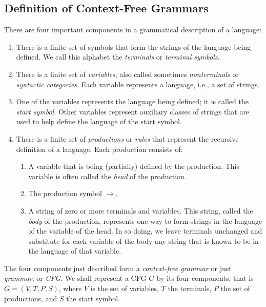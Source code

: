 \documentclass[]{article}
\begin{document}
  \subsection*{Definition of Context-Free Grammars}
    There are four important components in a grammatical description of a
    language:
      \begin{enumerate}
        \item There is a finite set of symbols that form the strings of the
        language being defined. We call this alphabet the \emph{terminals} or
        \emph{terminal symbols}.
        \item There is a finite set of \emph{variables}, also called sometimes
        \emph{nonterminals} or \emph{syntactic categories}. Each variable
        represents a language, i.e., a set of strings.
        \item One of the variables represents the language being defined; it is
        called the \emph{start symbol}. Other variables represent auxiliary
        classes of strings that are used to help define the language of the
        start symbol.
        \item There is a finite set of \emph{productions} or \emph{rules} that
        represent the recursive definition of a language. Each production
        consists of:
          \begin{enumerate}
            \item A variable that is being (partially) defined by the
            production. This variable is often called the \emph{head} of the
            production.
            \item The production symbol $\rightarrow$.
            \item A string of zero or more terminals and variables. This string,
            called the \emph{body} of the production, represents one way to form
            strings in the language of the variable of the head. In so doing, we
            leave terminals unchanged and substitute for each variable of the
            body any string that is known to be in the language of that
            variable.
          \end{enumerate}
      \end{enumerate}
    The four components just described form a \emph{context-free grammar} or
    just \emph{grammar}, or \emph{CFG}. We shall represent a CFG $G$ by its four
    components, that is $G = (V,T,P,S)$, where $V$ is the set of variables, $T$
    the terminals, $P$ the set of productions, and $S$ the start symbol.
\end{document}
